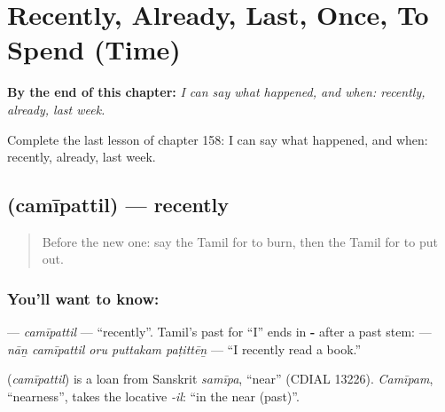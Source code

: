 
\chapter{Recently, Already, Last, Once, To Spend (Time)}
\label{ch:ta-recently-already-last-once-to-spend-time}

\begin{chapteropening}
\textbf{By the end of this chapter:} \emph{I can say what happened, and when: recently, already, last week.}

Complete the last lesson of chapter 158: I can say what happened, and when: recently, already, last week.
\end{chapteropening}

\section[\texorpdfstring{\ta{சமீபத்தில்} (camīpattil)}{சமீபத்தில் (camīpattil)}]{ (camīpattil) — recently}

\label{lesson:TA-C158-camipattil}



\begin{quote}
Before the new one: say the Tamil for to burn, then the Tamil for to put out.
\end{quote}

\subsection*{You'll want to know: }
\textbf{} — \emph{camīpattil} — \textquotedblleft{}recently\textquotedblright{}. Tamil's past for \textquotedblleft{}I\textquotedblright{} ends in \textbf{-} after a past stem: \textbf{    } — \emph{nāṉ camīpattil oru puttakam paṭittēṉ} — \textquotedblleft{}I recently read a book.\textquotedblright{}

\begin{cousinweb}
\textbf{} (\emph{camīpattil}) is a loan from Sanskrit \emph{samīpa}, \textquotedblleft{}near\textquotedblright{} (CDIAL 13226). \emph{Camīpam}, \textquotedblleft{}nearness\textquotedblright{}, takes the locative \emph{-il}: \textquotedblleft{}in the near (past)\textquotedblright{}.
\end{cousinweb}

